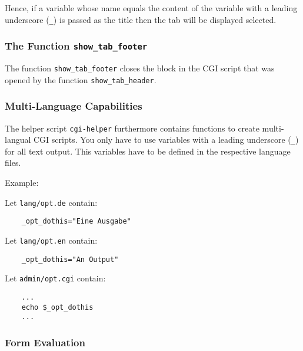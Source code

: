 Hence, if a variable whose name equals the content of the variable  with a
leading underscore (\texttt{\_}) is passed as the title then the tab will be displayed selected.

\subsubsection{The Function \texttt{show\_tab\_footer}}

The function \texttt{show\_tab\_footer} closes the block in the CGI script that was
opened by the function \texttt{show\_tab\_header}.

\subsubsection{Multi-Language Capabilities}

The helper script \texttt{cgi-helper} furthermore contains functions to create multi-langual CGI scripts.
You only have to use variables with a leading underscore (\texttt{\_}) for all text output. This variables have to
be defined in the respective language files.

Example:

Let \texttt{lang/opt.de} contain:

\begin{example}
\begin{verbatim}
    _opt_dothis="Eine Ausgabe"
\end{verbatim}
\end{example}

Let \texttt{lang/opt.en} contain:

\begin{example}
\begin{verbatim}
    _opt_dothis="An Output"
\end{verbatim}
\end{example}

Let \texttt{admin/opt.cgi} contain:

\begin{example}
\begin{verbatim}
    ...
    echo $_opt_dothis
    ...
\end{verbatim}
\end{example}


\subsubsection{Form Evaluation}

